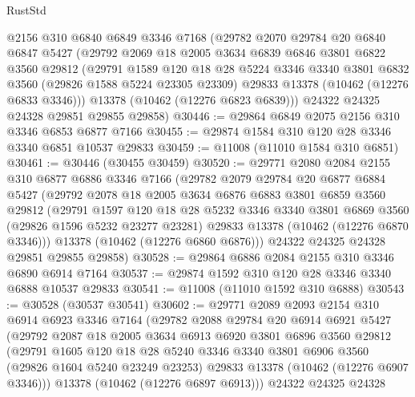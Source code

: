 \begin{lexlean}{RustStd}
\begin{coremodule}
    @2156
    @310
    @6840
    @6849
    @3346
    @7168
    (@29782
      @2070
      @29784
      @20
      @6840
      @6847
      @5427
      (@29792
        @2069
        @18
        @2005
        @3634
        @6839
        @6846
        @3801
        @6822
        @3560
        @29812
        (@29791
          @1589
          @120
          @18
          @28
          @5224
          @3346
          @3340
          @3801
          @6832
          @3560
          (@29826 @1588 @5224 @23305 @23309)
          @29833
          @13378
          (@10462 (@12276 @6833 @3346)))
        @13378
        (@10462 (@12276 @6823 @6839)))
      @24322
      @24325
      @24328
      @29851
      @29855
      @29858)
@30446 := @29864 @6849 @2075 @2156 @310 @3346 @6853 @6877 @7166
@30455 := @29874 @1584 @310 @120 @28 @3346 @3340 @6851 @10537 @29833
@30459 := @11008 (@11010 @1584 @310 @6851)
@30461 := @30446 (@30455 @30459)
@30520 := @29771
    @2080
    @2084
    @2155
    @310
    @6877
    @6886
    @3346
    @7166
    (@29782
      @2079
      @29784
      @20
      @6877
      @6884
      @5427
      (@29792
        @2078
        @18
        @2005
        @3634
        @6876
        @6883
        @3801
        @6859
        @3560
        @29812
        (@29791
          @1597
          @120
          @18
          @28
          @5232
          @3346
          @3340
          @3801
          @6869
          @3560
          (@29826 @1596 @5232 @23277 @23281)
          @29833
          @13378
          (@10462 (@12276 @6870 @3346)))
        @13378
        (@10462 (@12276 @6860 @6876)))
      @24322
      @24325
      @24328
      @29851
      @29855
      @29858)
@30528 := @29864 @6886 @2084 @2155 @310 @3346 @6890 @6914 @7164
@30537 := @29874 @1592 @310 @120 @28 @3346 @3340 @6888 @10537 @29833
@30541 := @11008 (@11010 @1592 @310 @6888)
@30543 := @30528 (@30537 @30541)
@30602 := @29771
    @2089
    @2093
    @2154
    @310
    @6914
    @6923
    @3346
    @7164
    (@29782
      @2088
      @29784
      @20
      @6914
      @6921
      @5427
      (@29792
        @2087
        @18
        @2005
        @3634
        @6913
        @6920
        @3801
        @6896
        @3560
        @29812
        (@29791
          @1605
          @120
          @18
          @28
          @5240
          @3346
          @3340
          @3801
          @6906
          @3560
          (@29826 @1604 @5240 @23249 @23253)
          @29833
          @13378
          (@10462 (@12276 @6907 @3346)))
        @13378
        (@10462 (@12276 @6897 @6913)))
      @24322
      @24325
      @24328

\end{coremodule}
\end{lexlean}
